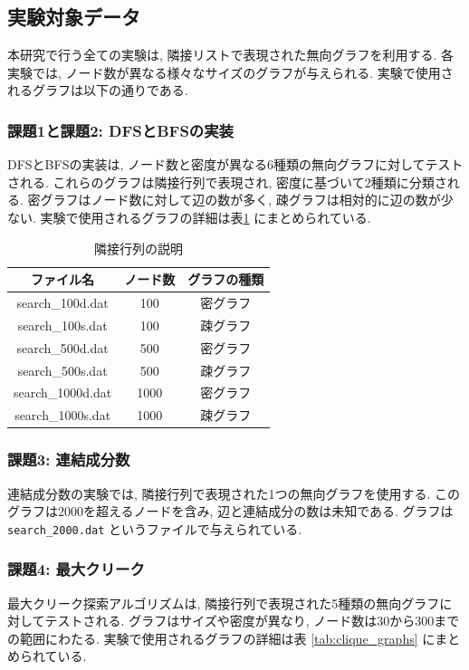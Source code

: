 \documentclass[a4j, 12pt]{jarticle}
\begin{document}
\subsection{実験対象データ}\label{sec:experimental-data}
本研究で行う全ての実験は, 隣接リストで表現された無向グラフを利用する. 各実験では, ノード数が異なる様々なサイズのグラフが与えられる. 実験で使用されるグラフは以下の通りである.

\subsubsection{課題1と課題2: DFSとBFSの実装}
DFSとBFSの実装は, ノード数と密度が異なる6種類の無向グラフに対してテストされる. これらのグラフは隣接行列で表現され, 密度に基づいて2種類に分類される. 密グラフはノード数に対して辺の数が多く, 疎グラフは相対的に辺の数が少ない. 実験で使用されるグラフの詳細は表\ref{tab:adjacency_matrices} にまとめられている.

\begin{table}[H]
  \centering
  \caption{隣接行列の説明}
  \begin{tabular}{|c|c|c|}
    \hline
    \textbf{ファイル名} & \textbf{ノード数} & \textbf{グラフの種類} \\
    \hline
    search\_100d.dat & 100 & 密グラフ \\
    search\_100s.dat & 100 & 疎グラフ \\
    search\_500d.dat & 500 & 密グラフ \\
    search\_500s.dat & 500 & 疎グラフ \\
    search\_1000d.dat & 1000 & 密グラフ \\
    search\_1000s.dat & 1000 & 疎グラフ \\
    \hline
  \end{tabular}\label{tab:adjacency_matrices}
\end{table}
\subsubsection{課題3: 連結成分数}
連結成分数の実験では, 隣接行列で表現された1つの無向グラフを使用する. このグラフは2000を超えるノードを含み, 辺と連結成分の数は未知である. グラフは \texttt{search\_2000.dat} というファイルで与えられている.

\subsubsection{課題4: 最大クリーク}\label{sec:greedy-coloring-algorithm}
最大クリーク探索アルゴリズムは, 隣接行列で表現された5種類の無向グラフに対してテストされる. グラフはサイズや密度が異なり, ノード数は30から300までの範囲にわたる. 実験で使用されるグラフの詳細は表 \ref{tab:clique_graphs} にまとめられている.
\end{document}
